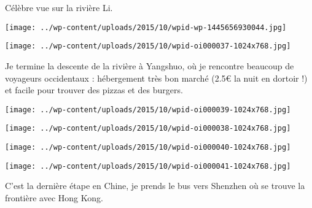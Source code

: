 Célèbre vue sur la rivière Li. 
\begin{center} \texttt{[image: ../wp-content/uploads/2015/10/wpid-wp-1445656930044.jpg]} \end{center}
\begin{center} \texttt{[image: ../wp-content/uploads/2015/10/wpid-oi000037-1024x768.jpg]} \end{center}

 Je termine la descente de la rivière à Yangshuo, où je rencontre beaucoup de voyageurs occidentaux : hébergement très bon marché (2.5€ la nuit en dortoir !) et facile pour trouver des pizzas et des burgers. 
\begin{center} \texttt{[image: ../wp-content/uploads/2015/10/wpid-oi000039-1024x768.jpg]} \end{center}
\begin{center} \texttt{[image: ../wp-content/uploads/2015/10/wpid-oi000038-1024x768.jpg]} \end{center}
\begin{center} \texttt{[image: ../wp-content/uploads/2015/10/wpid-oi000040-1024x768.jpg]} \end{center}
\begin{center} \texttt{[image: ../wp-content/uploads/2015/10/wpid-oi000041-1024x768.jpg]} \end{center}

 C'est la dernière étape en Chine, je prends le bus vers Shenzhen où se trouve la frontière avec Hong Kong.
